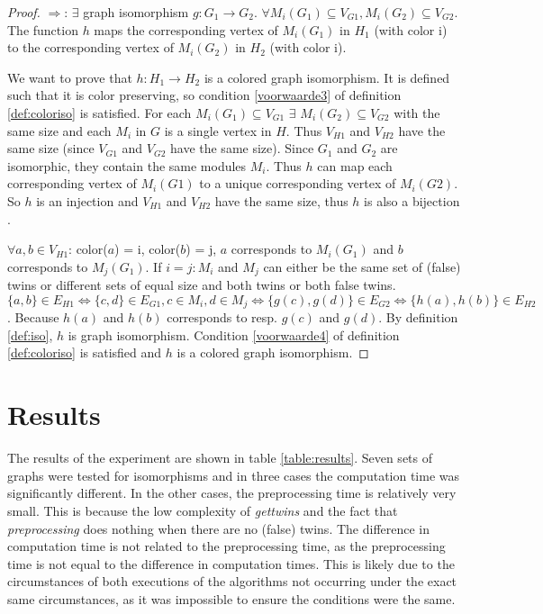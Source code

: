 \documentclass[twoside]{article}
\theoremstyle{definition}
\theoremstyle{plain}
\begin{document}
\begin{multicols}{2}
\begin{proof}
$\Rightarrow$: $\exists$ graph isomorphism $g: G_1 \to G_2$. $\forall M_i (G_1) \subseteq V_{G1}, M_i (G_2) \subseteq V_{G2}$. The function $h$ maps the corresponding vertex of $M_i (G_1)$ in $H_1$ (with color i) to the corresponding vertex of $M_i (G_2)$ in $H_2$ (with color i).

We want to prove that $h: H_1 \to H_2$ is a colored graph isomorphism. It is defined such that it is color preserving, so condition \ref{voorwaarde3} of definition \ref{def:coloriso} is satisfied. For each $M_i (G_1) \subseteq V_{G1}$ $\exists$ $M_i (G_2) \subseteq V_{G2}$ with the same size and each $M_i$ in $G$ is a single vertex in $H$. Thus $V_{H1}$ and $V_{H2}$ have the same size (since $V_{G1}$ and $V_{G2}$ have the same size). Since $G_1$ and $G_2$ are isomorphic, they contain the same modules $M_i$. Thus $h$ can map each corresponding vertex of $M_i (G1)$ to a unique corresponding vertex of $M_i (G2)$. So $h$ is an injection and $V_{H1}$ and $V_{H2}$ have the same size, thus $h$ is also a bijection \cite{website:proofwiki}.

$\forall a, b \in V_{H1}$: color($a$) = i, color($b$) = j, $a$ corresponds to $M_i (G_1)$ and $b$ corresponds to $M_j (G_1)$. If $i=j: M_i$ and $M_j$ can either be the same set of (false) twins or different sets of equal size and both twins or both false twins.  $ \{a, b\} \in E_{H1} \iff \{c,d\} \in E_{G1}, c \in  M_i, d \in  M_j \iff \{g(c),g(d)\} \in E_{G2} \iff \{h(a),h(b)\} \in E_{H2}$. Because $h(a)$ and $h(b)$ corresponds to resp. $g(c)$ and $g(d)$. By definition \ref{def:iso}, $h$ is graph isomorphism. Condition \ref{voorwaarde4} of definition \ref{def:coloriso} is satisfied and $h$ is a colored graph isomorphism.




\end{proof}

\section{Results}

The results of the experiment are shown in table \ref{table:results}. Seven sets of graphs were tested for isomorphisms and in three cases the computation time was significantly different. In the other cases, the preprocessing time is relatively very small. This is because the low complexity of \emph{gettwins} and the fact that \emph{preprocessing} does nothing when there are no (false) twins. The difference in computation time is not related to the preprocessing time, as the preprocessing time is not equal to the difference in computation times. This is likely due to the circumstances of both executions of the algorithms not occurring under the exact same circumstances, as it was impossible to ensure the conditions were the same.  


\end{multicols}
\end{document}
